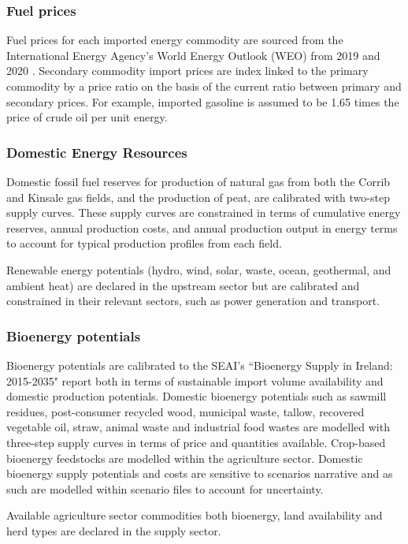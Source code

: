 \documentclass[journal abbreviation, manuscript]{copernicus}
\begin{document}
\subsubsection{Fuel prices}
Fuel prices for each imported energy commodity are sourced from the International Energy Agency's World Energy Outlook (WEO) from 2019 and 2020 \citep{InternationalEnergyAgency2020}. Secondary commodity import prices are index linked to the primary commodity by a price ratio on the basis of the current ratio between primary and secondary prices. For example, imported gasoline is assumed to be 1.65 times the price of crude oil per unit energy.


\subsubsection{Domestic Energy Resources}
Domestic fossil fuel reserves for production of natural gas from both the Corrib and Kinsale gas fields, and the production of peat, are calibrated with two-step supply curves. These supply curves are constrained in terms of cumulative energy reserves, annual production costs, and annual production output in energy terms to account for typical production profiles from each field.

Renewable energy potentials (hydro, wind, solar, waste, ocean, geothermal, and ambient heat) are declared in the upstream sector but are calibrated and constrained in their relevant sectors, such as power generation and transport.

\subsubsection{Bioenergy potentials}
Bioenergy potentials are calibrated to the SEAI's ``Bioenergy Supply in Ireland: 2015-2035" report \citep{SEAI2015} both in terms of sustainable import volume availability and domestic production potentials. Domestic bioenergy potentials such as sawmill residues, post-consumer recycled wood, municipal waste, tallow, recovered vegetable oil, straw, animal waste and industrial food wastes are modelled with three-step supply curves in terms of price and quantities available. Crop-based bioenergy feedstocks are modelled within the agriculture sector. Domestic bioenergy supply potentials and costs are sensitive to scenarios narrative and as such are modelled within scenario files to account for uncertainty.

Available agriculture sector commodities both bioenergy, land availability and herd types are declared in the supply sector.
\end{document}
